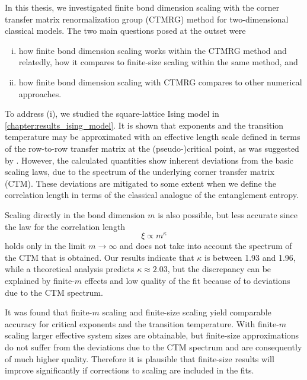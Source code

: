 In this thesis, we investigated finite bond dimension scaling with the corner transfer matrix renormalization group
(CTMRG) method for two-dimensional classical models.
The two main questions posed at the outset were
\begin{enumerate}[(i)]
  \item how finite bond dimension scaling works within the CTMRG method
  and relatedly, how it compares to finite-size scaling within the same method, and\label{enumerate:1}
  \item how finite bond dimension scaling with CTMRG compares to other numerical approaches.\label{enumerate:2}
\end{enumerate}

To address (i), we studied the square-lattice Ising model in \autoref{chapter:results_ising_model}.
It is shown that exponents and the transition temperature may be approximated with an effective length scale defined in
terms of the row-to-row transfer matrix at the (pseudo-)critical point,
as was suggested by \cite{nishino1996numerical}.
However, the calculated quantities show inherent deviations from the basic scaling laws,
due to the spectrum of the underlying corner transfer matrix (CTM).
These deviations are mitigated to some extent when we define the correlation length in terms of the classical analogue
of the entanglement entropy.

Scaling directly in the bond dimension $m$ is also possible, but less accurate since the law for the correlation
length
\begin{equation*}
  \xi \propto m^{\kappa}
\end{equation*}
holds only in the limit $m \to \infty$ and does not take into account the spectrum of the CTM that is obtained.
Our results indicate that $\kappa$ is between 1.93 and 1.96, while a theoretical analysis \cite{pollmann2009theory}
predicts $\kappa \approx 2.03$, but the discrepancy can be explained by finite-$m$ effects and low quality of the fit
because of to deviations due to the CTM spectrum.

It was found that finite-$m$ scaling and finite-size scaling yield comparable accuracy for critical exponents and the
transition temperature.
With finite-$m$ scaling larger effective system sizes are obtainable,
but finite-size approximations do not suffer from the deviations due to the CTM spectrum and are
consequently of much higher quality. Therefore it is plausible that finite-size results will improve significantly if
corrections to scaling are included in the fits.


